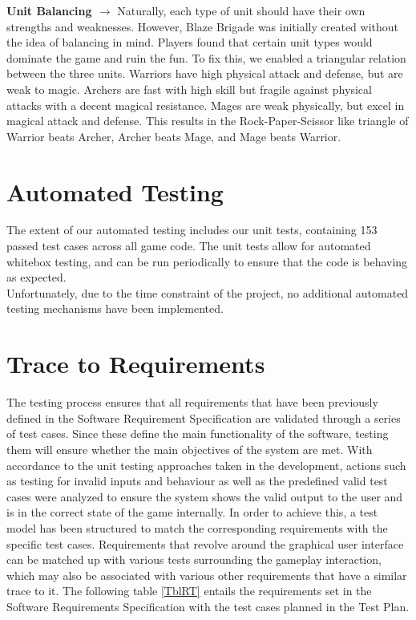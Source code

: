 \documentclass{article}
\begin{document}
\begin{description}[leftmargin=0.2cm]
\item \textbf{Unit Balancing $\rightarrow$} Naturally, each type of unit should have their own strengths and weaknesses. However, Blaze Brigade was initially created without the idea of balancing in mind. Players found that certain unit types would dominate the game and ruin the fun. To fix this, we enabled a triangular relation between the three units. Warriors have high physical attack and defense, but are weak to magic. Archers are fast with high skill but fragile against physical attacks with a decent magical resistance. Mages are weak physically, but excel in magical attack and defense. This results in the Rock-Paper-Scissor like triangle of Warrior beats Archer, Archer beats Mage, and Mage beats Warrior.
\end{description}

\section{Automated Testing}

The extent of our automated testing includes our unit tests, containing 153 passed test cases across all game code. The unit tests allow for automated whitebox testing, and can be run periodically to ensure that the code is behaving as expected. \\

Unfortunately, due to the time constraint of the project, no additional automated testing mechanisms have been implemented.
		
\section{Trace to Requirements}

The testing process ensures that all requirements that have been previously defined in the Software Requirement Specification are validated through a series of test cases. Since these define the main functionality of the software, testing them will ensure whether the main objectives of the system are met. With accordance to the unit testing approaches taken in the development, actions such as testing for invalid inputs and behaviour as well as the predefined valid test cases were analyzed to ensure the system shows the valid output to the user and is in the correct state of the game internally. In order to achieve this, a test model has been structured to match the corresponding requirements with the specific test cases. Requirements that revolve around the graphical user interface can be matched up with various tests surrounding the gameplay interaction, which may also be associated with various other requirements that have a similar trace to it. The following table \ref{TblRT} entails the requirements set in the Software Requirements Specification with the test cases planned in the Test Plan. 
\end{document}
